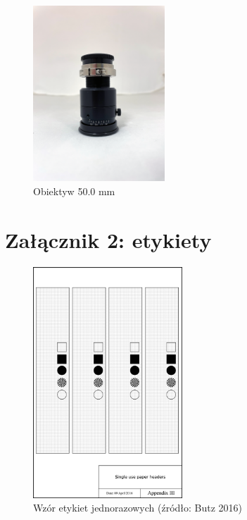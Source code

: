\documentclass[
  letterpaper,
  DIV=11,
  numbers=noendperiod]{scrreprt}
\begin{document}
\begin{figure}

{\centering \includegraphics[width=1.94792in,height=\textheight]{images/specim-50.0.png}

}

\caption{Obiektyw 50.0 mm}

\end{figure}

\newpage{}

\hypertarget{zaux142ux105cznik-2-etykiety}{%
\section{Załącznik 2: etykiety}\label{zaux142ux105cznik-2-etykiety}}

\begin{figure}

{\centering \includegraphics[width=0.5\textwidth,height=\textheight]{images/hsi_labels.jpg}

}

\caption{Wzór etykiet jednorazowych (źródło: Butz 2016)}

\end{figure}
\end{document}

